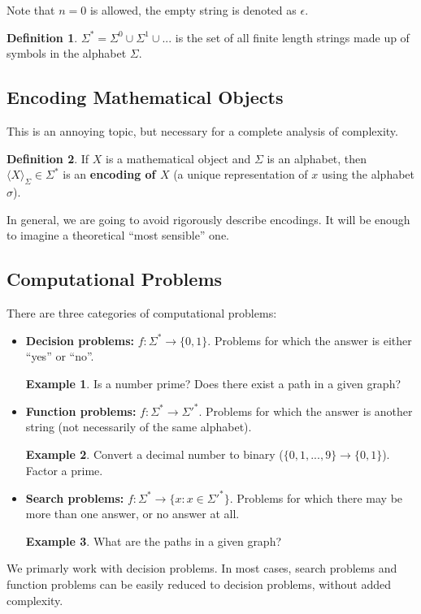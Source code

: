 \documentclass[11pt]{article}
\theoremstyle{plain}
\theoremstyle{definition}
\newtheorem*{defn}{Definition}
\newtheorem*{ex}{Example}
\begin{document}
Note that $n = 0$ is allowed, the empty string is denoted as $\epsilon$.

\begin{defn}
    $\Sigma^* = \Sigma^0 \cup \Sigma^1 \cup ...$ is the set of all finite length strings made up of
    symbols in the alphabet $\Sigma$.
\end{defn}

\subsection{Encoding Mathematical Objects}

This is an annoying topic, but necessary for a complete analysis of complexity. 

\begin{defn}
    If $X$ is a mathematical object and $\Sigma$ is an alphabet, then $\langle X \rangle_\Sigma \in
    \Sigma^*$ is an {\bf encoding of $X$} (a unique representation of $x$ using the alphabet $\sigma$).
\end{defn}

In general, we are going to avoid rigorously describe encodings. It will be enough to imagine a 
theoretical ``most sensible'' one.

\subsection{Computational Problems}

There are three categories of computational problems:

\begin{itemize}
    \item {\bf Decision problems:} $f: \Sigma^* \to \{0, 1\}$. Problems for which the answer is 
        either ``yes'' or ``no''.
    
        \begin{ex}
            Is a number prime? Does there exist a path in a given graph?
        \end{ex}

    \item {\bf Function problems:} $f: \Sigma^* \to \Sigma'^*$. Problems for which the answer is 
        another string (not necessarily of the same alphabet).

        \begin{ex}
            Convert a decimal number to binary ($\{0, 1, ..., 9\} \to \{0, 1\}$). 
            Factor a prime.
        \end{ex}

    \item {\bf Search problems:} $f: \Sigma^* \to \{x : x \in \Sigma'^*\}$. 
        Problems for which there may be more than one answer, or no answer at all.

        \begin{ex}
            What are the paths in a given graph?
        \end{ex}
\end{itemize}

We primarly work with decision problems. In most cases, search problems and function problems can be
easily reduced to decision problems, without added complexity.
\end{document}
